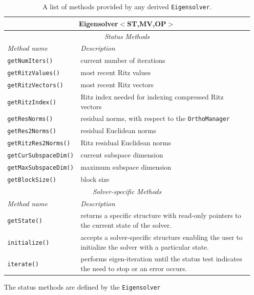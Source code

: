 \documentclass[acmtoms]{acmtrans2m}
\newcommand{\aspace}[1]{\texttt{#1}}
\begin{document}
\begin{table}[htp]
\begin{center}
\caption{A list of methods provided by any derived \aspace{Eigensolver}.} 
\label{tab:anasazi:itermethods}
\begin{tabular}{| p{3cm} | p{6cm} |}
\hline
\multicolumn{2}{|c|}{\textbf{Eigensolver$<$ST,MV,OP$>$}} \\\hline
\multicolumn{2}{|c|}{\emph{Status Methods}} \\
\hline
\emph{Method name} & \emph{Description} \\
\hline
{\tt getNumIters()}       & current number of iterations \\
{\tt getRitzValues()}     & most recent Ritz values \\
{\tt getRitzVectors()}    & most recent Ritz vectors \\
{\tt getRitzIndex()}      & Ritz index needed for indexing compressed Ritz vectors \\
{\tt getResNorms()}       & residual norms, with respect to the \aspace{OrthoManager} \\
{\tt getRes2Norms()}      & residual Euclidean norms \\
{\tt getRitzRes2Norms()}  & Ritz residual  Euclidean norms \\
{\tt getCurSubspaceDim()} & current subspace dimension \\
{\tt getMaxSubspaceDim()} & maximum subspace dimension \\
{\tt getBlockSize()}      & block size \\
\hline
\multicolumn{2}{|c|}{\emph{Solver-specific Methods}} \\
\hline
\emph{Method name} & \emph{Description} \\
\hline
{\tt getState()}       & returns a specific structure with read-only pointers to
                       the current state of the solver. \\
{\tt initialize()}     & accepts a solver-specific structure enabling the user to initialize
                       the solver with a particular state.\\
{\tt iterate()}        & performs eigen-iteration until the status test indicates the need
                       to stop or an error occurs.\\
\hline
\end{tabular}
\end{center}
\end{table}
The status methods are defined by the \aspace{Eigensolver}
\end{document}
